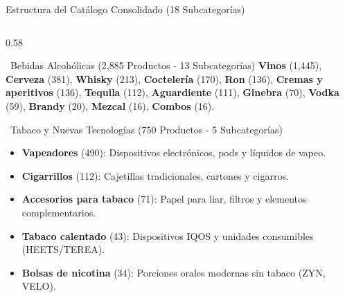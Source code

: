 \documentclass[aspectratio=169, 10pt]{beamer}
\begin{document}
\begin{frame}{Estructura del Catálogo Consolidado (18 Subcategorías)}
\begin{columns}[c]
        \begin{column}{0.58\textwidth}
            \begin{block}{\faWineGlass\ Bebidas Alcohólicas (2,885 Productos - 13 Subcategorías)}
                \scriptsize \textbf{Vinos} (1,445), \textbf{Cerveza} (381), \textbf{Whisky} (213), \textbf{Coctelería} (170), \textbf{Ron} (136), \textbf{Cremas y aperitivos} (136), \textbf{Tequila} (112), \textbf{Aguardiente} (111), \textbf{Ginebra} (70), \textbf{Vodka} (59), \textbf{Brandy} (20), \textbf{Mezcal} (16), \textbf{Combos} (16).
            \end{block}
            \vspace{0.15cm}
            \begin{block}{\faSmoking\ Tabaco y Nuevas Tecnologías (750 Productos - 5 Subcategorías)}
                \scriptsize 
                \begin{itemize}
                    \setlength{\itemsep}{2pt}
                    \item \textbf{Vapeadores} (490): Dispositivos electrónicos, pods y líquidos de vapeo.
                    \item \textbf{Cigarrillos} (112): Cajetillas tradicionales, cartones y cigarros.
                    \item \textbf{Accesorios para tabaco} (71): Papel para liar, filtros y elementos complementarios.
                    \item \textbf{Tabaco calentado} (43): Dispositivos IQOS y unidades consumibles (HEETS/TEREA).
                    \item \textbf{Bolsas de nicotina} (34): Porciones orales modernas sin tabaco (ZYN, VELO).
                \end{itemize}
            \end{block}
        \end{column}
    \end{columns}
\end{frame}
\end{document}
